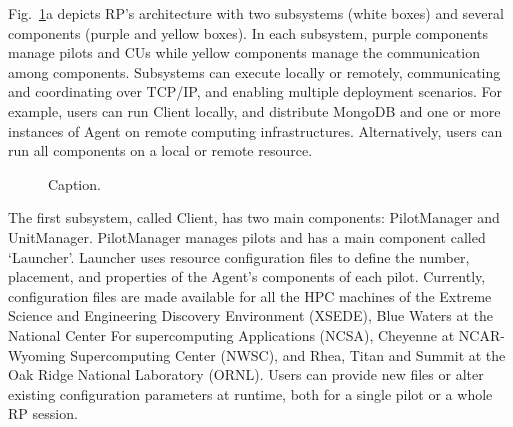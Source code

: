\documentclass[preprint,12pt, a4paper]{elsarticle}
\begin{document}
Fig.~\ref{fig:archs}a depicts RP's architecture with two subsystems (white
boxes) and several components (purple and yellow boxes). In each subsystem,
purple components manage pilots and CUs while yellow components manage the
communication among components. Subsystems can execute locally or remotely,
communicating and coordinating over TCP/IP, and enabling multiple deployment
scenarios. For example, users can run Client locally, and distribute MongoDB
and one or more instances of Agent on remote computing infrastructures.
Alternatively, users can run all components on a local or remote resource.

\begin{figure}
    \centering
    \qquad
    \caption{Caption. }\label{fig:archs}
\end{figure}

The first subsystem, called Client, has two main components: PilotManager and
UnitManager. PilotManager manages pilots and has a main component called
`Launcher'. Launcher uses resource configuration files to define the number,
placement, and properties of the Agent's components of each pilot. Currently,
configuration files are made available for all the HPC machines of the
Extreme Science and Engineering Discovery Environment (XSEDE), Blue Waters at
the National Center For supercomputing Applications (NCSA), Cheyenne at
NCAR-Wyoming Supercomputing Center (NWSC), and Rhea, Titan and Summit at the
Oak Ridge National Laboratory (ORNL). Users can provide new files or alter
existing configuration parameters at runtime, both for a single pilot or a
whole RP session.
\end{document}

